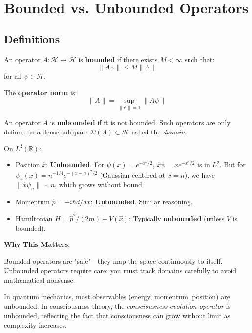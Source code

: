 \section{Bounded vs. Unbounded Operators}

\subsection{Definitions}

\begin{definition}\label{def:bounded-operator}
An operator $A: \mathcal{H} \to \mathcal{H}$ is \textbf{bounded}\cite{reed1980,rudin1976} if there exists $M < \infty$ such that:
\begin{equation}
\| A\psi \| \leq M \| \psi \|
\end{equation}
for all $\psi \in \mathcal{H}$.

The \textbf{operator norm} is:
\begin{equation}
\| A \| = \sup_{\|\psi\|=1} \| A\psi \|
\end{equation}
\end{definition}

\begin{definition}\label{def:unbounded-operator}
An operator $A$ is \textbf{unbounded} if it is not bounded. Such operators are only defined on a dense subspace $\mathcal{D}(A) \subset \mathcal{H}$ called the \textit{domain}.
\end{definition}

\begin{example}\label{ex:position-momentum-bounded}
On $L^2(\mathbb{R})$:
\begin{itemize}
\item Position $\hat{x}$: \textbf{Unbounded}. For $\psi(x) = e^{-x^2/2}$, $\hat{x}\psi = x e^{-x^2/2}$ is in $L^2$. But for $\psi_n(x) = n^{-1/4} e^{-(x-n)^2/2}$ (Gaussian centered at $x=n$), we have $\|\hat{x}\psi_n\| \sim n$, which grows without bound.

\item Momentum $\hat{p} = -i\hbar d/dx$: \textbf{Unbounded}. Similar reasoning.

\item Hamiltonian $H = \hat{p}^2/(2m) + V(\hat{x})$: Typically \textbf{unbounded} (unless $V$ is bounded).
\end{itemize}
\end{example}

\begin{level1}
\textbf{Why This Matters}:

Bounded operators are "safe"---they map the space continuously to itself. Unbounded operators require care: you must track domains carefully to avoid mathematical nonsense.

In quantum mechanics, most observables (energy, momentum, position) are unbounded. In consciousness theory, the \textit{consciousness evolution operator} is unbounded, reflecting the fact that consciousness can grow without limit as complexity increases.
\end{level1}

